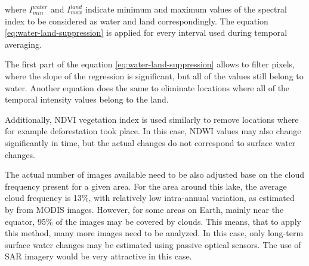 where $I_{min}^{water}$ and $I_{max}^{land}$ indicate minimum and maximum values of the spectral index to be considered as water and land correspondingly. The equation \ref{eq:water-land-suppression} is applied for every interval used during temporal averaging.

The first part of the equation \ref{eq:water-land-suppression} allows to filter pixels, where the slope of the regression is significant, but all of the values still belong to water. Another equation does the same to eliminate locations where all of the temporal intensity values belong to the land.

Additionally, NDVI vegetation index is used similarly to remove locations where for example deforestation took place. In this case, NDWI values may also change significantly in time, but the actual changes do not correspond to surface water changes.


The actual number of images available need to be also adjusted base on the cloud frequency present for a given area. For the area around this lake, the average cloud frequency is 13\%, with relatively low intra-annual variation, as estimated by \citet{wilson2016remotely} from MODIS images. However, for some areas on Earth, mainly near the equator, 95\% of the images may be covered by clouds. This means, that to apply this method, many more images need to be analyzed. In this case, only long-term surface water changes may be estimated using passive optical sensors. The use of SAR imagery would be very attractive in this case.

